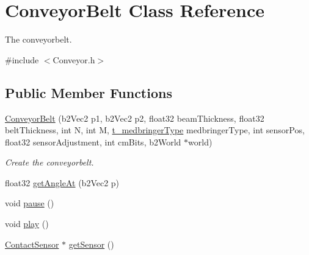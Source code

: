 \hypertarget{classConveyorBelt}{\section{Conveyor\-Belt Class Reference}
\label{classConveyorBelt}
}


The conveyorbelt.  




{\ttfamily \#include $<$Conveyor.\-h$>$}

\subsection*{Public Member Functions}
\begin{DoxyCompactItemize}
\item 
\hyperlink{classConveyorBelt_a054992c219cd54cffd1b31aa819c25f0}{Conveyor\-Belt} (b2\-Vec2 p1, b2\-Vec2 p2, float32 beam\-Thickness, float32 belt\-Thickness, int N, int M, \hyperlink{Conveyor_8h_a98261db3679be2885c0bdad13c27d7b1}{t\-\_\-medbringer\-Type} medbringer\-Type, int sensor\-Pos, float32 sensor\-Adjustment, int cm\-Bits, b2\-World $\ast$world)
\begin{DoxyCompactList}\small\item\em Create the conveyorbelt. \end{DoxyCompactList}\item 
float32 \hyperlink{classConveyorBelt_acf80525e6c5e618ffac5c8e8d0eed38c}{get\-Angle\-At} (b2\-Vec2 p)
\item 
void \hyperlink{classConveyorBelt_accae6e53d7d8e37e86aa9d4649c64481}{pause} ()
\item 
void \hyperlink{classConveyorBelt_af862468684b4bf0f1b05141ea8ee7943}{play} ()
\item 
\hyperlink{classContactSensor}{Contact\-Sensor} $\ast$ \hyperlink{classConveyorBelt_ada62b4755b222ef7a07233d5478c67a2}{get\-Sensor} ()
\end{DoxyCompactItemize}

